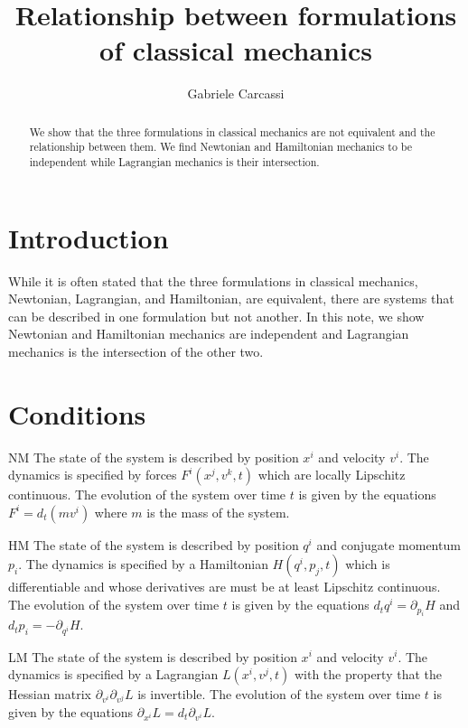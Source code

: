 \documentclass{techbrief}
\title{Relationship between formulations of classical mechanics}
\author{Gabriele Carcassi}
\begin{document}
	
	\maketitle
	
	\begin{abstract}
		We show that the three formulations in classical mechanics are not equivalent and the relationship between them. We find Newtonian and Hamiltonian mechanics to be independent while Lagrangian mechanics is their intersection.

	\end{abstract}
	
	\section{Introduction}
	While it is often stated that the three formulations in classical mechanics, Newtonian, Lagrangian, and Hamiltonian, are equivalent, there are systems that can be described in one formulation but not another. In this note, we show Newtonian and Hamiltonian mechanics are independent and Lagrangian mechanics is the intersection of the other two.
	\section{Conditions}
		\begin{condition}{NM}
			The state of the system is described by position $x^{i}$ and velocity $v^{i}$. The dynamics is specified by forces $F^{i}(x^{j},v^{k},t)$ which are locally Lipschitz continuous. The evolution of the system over time $t$ is given by the equations $F^{i} = d_{t}(mv^{i})$ where $m$ is the mass of the system.
		\end{condition}
		
		\begin{condition}{HM}
			The state of the system is described by position $q^{i}$ and conjugate momentum $p_{i}$. The dynamics is specified by a Hamiltonian $H(q^{i},p_{j},t)$ which is differentiable and whose derivatives are must be at least Lipschitz continuous. The evolution of the system over time $t$ is given by the equations $d_{t}q^{i} = \partial_{p_{i}}H$ and $d_{t}p_{i} = -\partial_{q^{i}}H$.
		\end{condition}
		
		\begin{condition}{LM}
			The state of the system is described by position $x^{i}$ and velocity $v^{i}$. The dynamics is specified by a Lagrangian $L(x^{i},v^{j},t)$ with the property that the Hessian matrix $\partial_{v^{i}}\partial_{v^{j}}L$ is invertible. The evolution of the system over time $t$ is given by the equations $\partial_{x^{i}}L = d_{t}\partial_{v^{i}}L$.
		\end{condition}
	
\end{document}

